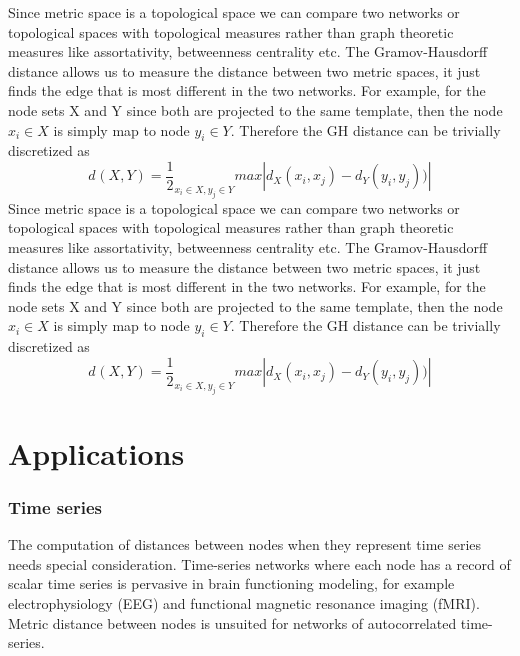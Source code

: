 \documentclass[onecollarge,runningheads]{svjour2}
\begin{document}
Since metric space is a topological space we can compare two networks or topological spaces with topological measures rather than graph theoretic measures like assortativity, betweenness centrality etc.
The Gramov-Hausdorff distance allows us to measure the distance between two metric spaces, it just finds the edge that is most different in the two networks. For example, for the node sets X and Y since both are projected to the same template, then the node $x_i \in X$ is simply map to node $y_i \in Y$. Therefore the GH distance can be trivially discretized as 
\begin{equation}
d_{}(X,Y) = \frac{1}{2}_{x_i \in X, y_j \in Y} max |d_X(x_i,x_j) - d_Y(y_i,y_j))|
\end{equation} 
Since metric space is a topological space we can compare two networks or topological spaces with topological measures rather than graph theoretic measures like assortativity, betweenness centrality etc.
The Gramov-Hausdorff distance allows us to measure the distance between two metric spaces, it just finds the edge that is most different in the two networks. For example, for the node sets X and Y since both are projected to the same template, then the node $x_i \in X$ is simply map to node $y_i \in Y$. Therefore the GH distance can be trivially discretized as 
\begin{equation}
d_{}(X,Y) = \frac{1}{2}_{x_i \in X, y_j \in Y} max |d_X(x_i,x_j) - d_Y(y_i,y_j))|
\end{equation} 


\section{Applications}


\subsubsection*{Time series}   
The computation of distances between nodes when they represent time series needs special consideration. Time-series networks where each node has a record of scalar time series is pervasive in brain functioning modeling, for example electrophysiology (EEG) and functional magnetic resonance imaging (fMRI).
Metric distance between nodes is unsuited for networks of autocorrelated time-series. 
\end{document}
